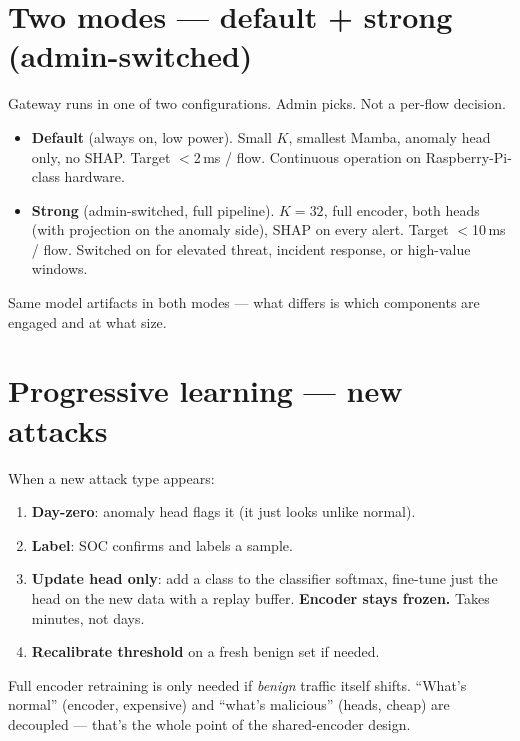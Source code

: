 \documentclass[11pt,a4paper]{article}
\begin{document}
\section{Two modes --- default + strong (admin-switched)}
Gateway runs in one of two configurations. Admin picks. Not a per-flow decision.
\begin{itemize}[leftmargin=*, itemsep=1pt, topsep=2pt]
  \item \textbf{Default} (always on, low power). Small $K$, smallest Mamba, anomaly head only, no SHAP. Target $<$2\,ms / flow. Continuous operation on Raspberry-Pi-class hardware.
  \item \textbf{Strong} (admin-switched, full pipeline). $K\!=\!32$, full encoder, both heads (with projection on the anomaly side), SHAP on every alert. Target $<$10\,ms / flow. Switched on for elevated threat, incident response, or high-value windows.
\end{itemize}
Same model artifacts in both modes --- what differs is which components are engaged and at what size.

\section{Progressive learning --- new attacks}
When a new attack type appears:
\begin{enumerate}[leftmargin=*, itemsep=1pt, topsep=2pt]
  \item \textbf{Day-zero}: anomaly head flags it (it just looks unlike normal).
  \item \textbf{Label}: SOC confirms and labels a sample.
  \item \textbf{Update head only}: add a class to the classifier softmax, fine-tune just the head on the new data with a replay buffer. \textbf{Encoder stays frozen.} Takes minutes, not days.
  \item \textbf{Recalibrate threshold} on a fresh benign set if needed.
\end{enumerate}
Full encoder retraining is only needed if \emph{benign} traffic itself shifts. ``What's normal'' (encoder, expensive) and ``what's malicious'' (heads, cheap) are decoupled --- that's the whole point of the shared-encoder design.

\end{document}
